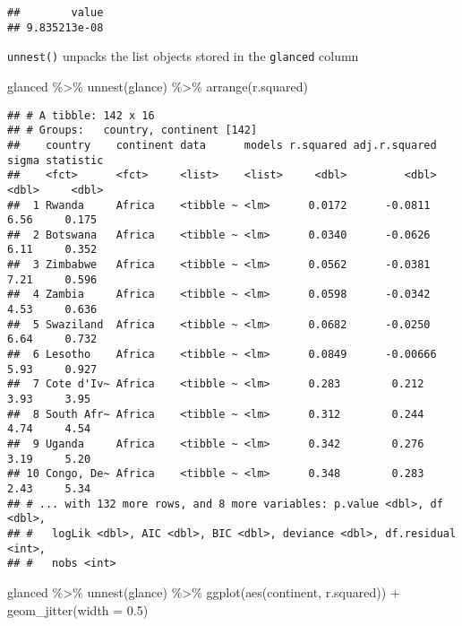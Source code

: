 \documentclass[
]{book}
\newenvironment{Shaded}{\begin{snugshade}}{\end{snugshade}}
\newcommand{\AttributeTok}[1]{\textcolor[rgb]{0.77,0.63,0.00}{#1}}
\newcommand{\FloatTok}[1]{\textcolor[rgb]{0.00,0.00,0.81}{#1}}
\newcommand{\FunctionTok}[1]{\textcolor[rgb]{0.00,0.00,0.00}{#1}}
\newcommand{\NormalTok}[1]{#1}
\newcommand{\SpecialCharTok}[1]{\textcolor[rgb]{0.00,0.00,0.00}{#1}}
\begin{document}
\begin{verbatim}
##        value 
## 9.835213e-08
\end{verbatim}

\texttt{unnest()} unpacks the list objects stored in the \texttt{glanced} column

\begin{Shaded}
\begin{Highlighting}[]
\NormalTok{glanced }\SpecialCharTok{\%\textgreater{}\%}
  \FunctionTok{unnest}\NormalTok{(glance) }\SpecialCharTok{\%\textgreater{}\%}
  \FunctionTok{arrange}\NormalTok{(r.squared) }
\end{Highlighting}
\end{Shaded}

\begin{verbatim}
## # A tibble: 142 x 16
## # Groups:   country, continent [142]
##    country    continent data      models r.squared adj.r.squared sigma statistic
##    <fct>      <fct>     <list>    <list>     <dbl>         <dbl> <dbl>     <dbl>
##  1 Rwanda     Africa    <tibble ~ <lm>      0.0172      -0.0811   6.56     0.175
##  2 Botswana   Africa    <tibble ~ <lm>      0.0340      -0.0626   6.11     0.352
##  3 Zimbabwe   Africa    <tibble ~ <lm>      0.0562      -0.0381   7.21     0.596
##  4 Zambia     Africa    <tibble ~ <lm>      0.0598      -0.0342   4.53     0.636
##  5 Swaziland  Africa    <tibble ~ <lm>      0.0682      -0.0250   6.64     0.732
##  6 Lesotho    Africa    <tibble ~ <lm>      0.0849      -0.00666  5.93     0.927
##  7 Cote d'Iv~ Africa    <tibble ~ <lm>      0.283        0.212    3.93     3.95 
##  8 South Afr~ Africa    <tibble ~ <lm>      0.312        0.244    4.74     4.54 
##  9 Uganda     Africa    <tibble ~ <lm>      0.342        0.276    3.19     5.20 
## 10 Congo, De~ Africa    <tibble ~ <lm>      0.348        0.283    2.43     5.34 
## # ... with 132 more rows, and 8 more variables: p.value <dbl>, df <dbl>,
## #   logLik <dbl>, AIC <dbl>, BIC <dbl>, deviance <dbl>, df.residual <int>,
## #   nobs <int>
\end{verbatim}

\begin{Shaded}
\begin{Highlighting}[]
\NormalTok{glanced }\SpecialCharTok{\%\textgreater{}\%}
  \FunctionTok{unnest}\NormalTok{(glance) }\SpecialCharTok{\%\textgreater{}\%}
  \FunctionTok{ggplot}\NormalTok{(}\FunctionTok{aes}\NormalTok{(continent, r.squared)) }\SpecialCharTok{+}
  \FunctionTok{geom\_jitter}\NormalTok{(}\AttributeTok{width =} \FloatTok{0.5}\NormalTok{)}
\end{Highlighting}
\end{Shaded}
\end{document}
